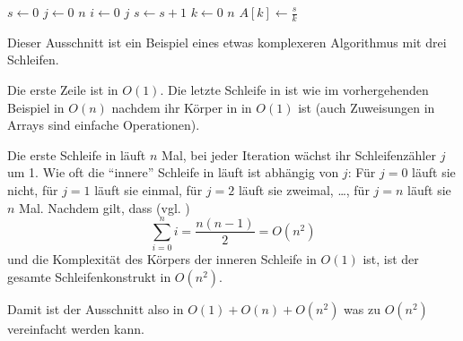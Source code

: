 \begin{codebox}
    \li $s \gets 0$                     \label{ln:ex3-setup}
    \li \For $j \gets 0$ \To $n$        \label{ln:ex3-outer-for}
    \li     \Do
                \For $i \gets 0$ \To $j$\label{ln:ex3-inner-for}
    \li             \Do
                        $s \gets s + 1$ \label{ln:ex3-inner-for-body}
                    \End
            \End
    \li \For $k \gets 0$ \To $n$        \label{ln:ex3-second-for}
    \li     \Do
                $A[k] \gets \frac{s}{k}$\label{ln:ex3-second-for-body}
            \End
\end{codebox}

Dieser Ausschnitt ist ein Beispiel eines etwas komplexeren Algorithmus mit drei \For Schleifen.

Die erste Zeile ist in $O(1)$. Die letzte Schleife in  ist wie im vorhergehenden Beispiel in $O(n)$ nachdem ihr Körper in  in $O(1)$ ist (auch Zuweisungen in Arrays sind einfache Operationen).

Die erste Schleife in  läuft $n$ Mal, bei jeder Iteration wächst ihr Schleifenzähler $j$ um 1. Wie oft die \enquote{innere} Schleife in  läuft ist abhängig von $j$: Für $j = 0$ läuft sie nicht, für $j = 1$ läuft sie einmal, für $j = 2$ läuft sie zweimal, \ldots, für $j = n$ läuft sie $n$ Mal. Nachdem gilt, dass (vgl. \cite{cf2007})
\begin{equation*}
    \sum_{i = 0}^{n} i = \frac{n(n - 1)}{2} = O(n^2)
\end{equation*}
und die Komplexität des Körpers der inneren Schleife in $O(1)$ ist, ist der gesamte Schleifenkonstrukt in $O(n^2)$.

Damit ist der Ausschnitt also in $O(1) + O(n) + O(n^2)$ was zu $O(n^2)$ vereinfacht werden kann.

